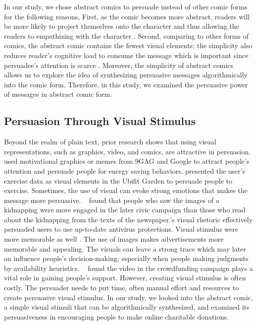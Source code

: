 In our study, we chose abstract comics to persuade instead of other comic forms for the following reasons, First, as the comic becomes more abstract, readers will be more likely to project themselves onto the character and thus allowing the readers to empathizing with the character \cite{scott1993understanding}. Second, comparing to other forms of comics, the abstract comic contains the fewest visual elements; the simplicity also reduces reader's cognitive load to consume the message which is important since persuadee's attention is scarce \cite{Janssen2016}. Moreover, the simplicity of abstract comics allows us to explore the idea of synthesizing persuasive messages algorithmically into the comic form. Therefore, in this study, we examined the persuasive power of messages in abstract comic form.

\subsection{Persuasion Through Visual Stimulus}
Beyond the realm of plain text, prior research shows that using visual representations, such as graphics, video, and comics, are attractive in persuasion. \textcite{selker2015sweetbuildinggreeter} used motivational graphics or memes from 9GAG and Google to attract people's attention and persuade people for energy saving behaviors. \textcite{consolvo2008activity} presented the user's exercise data as visual elements in the Ubifit Garden to persuade people to exercise. Sometimes, the use of visual can evoke strong emotions that makes the message more persuasive. ~\textcite{iyer2006picture} found that people who saw the images of a kidnapping were more engaged in the later civic campaign than those who read about the kidnapping from the texts of the newspaper.\textcite{zhang2014stop}'s visual rhetoric effectively persuaded users to use up-to-date antivirus protections. Visual stimulus were more memorable as well \cite{nisbett1980human}. The use of images makes advertisements more memorable and appealing. The visuals can leave a strong trace which may later on influence people's decision-making, especially when people making judgments by availability heuristics. ~\textcite{dey2017art} found the video in the crowdfunding campaign plays a vital role in gaining people's support. However, creating visual stimulus is often costly. The persuader needs to put time, often manual effort and resources to create persuasive visual stimulus. In our study, we looked into the abstract comic, a simple visual stimuli that can be algorithmically synthesized, and examined its persuasiveness in encouraging people to make online charitable donations. 
